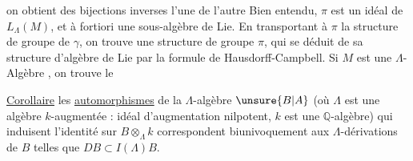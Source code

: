 
on obtient des bijections inverses l'une de l'autre
\diagram{\begin{tikzcd}[ampersand replacement=\&]
\pi \arrow[r,bend left=15,"\exp"] \& \gamma \arrow[l,bend left=15,"\log"]
\end{tikzcd}}
Bien entendu, $\pi$ est un idéal  de $L_\Lambda(M)$, et
à fortiori une sous-algèbre de Lie. En
transportant à $\pi$ la structure de groupe de
$\gamma$, on trouve une structure de groupe 
$\pi$, qui se déduit de sa structure
d'algèbre de Lie par la formule de
Hausdorff-Campbell. Si $M$ est une
$\Lambda$-Algèbre , on trouve le

\uline{Corollaire} les \uline{automorphismes} de la
$\Lambda$-algèbre \uline{$\unsure{B|A}$} (où $\Lambda$ est une algèbre
$k$-augmentée :  idéal d'augmentation
nilpotent, $k$ est une $\mathbb Q$-algèbre)
qui induisent l'identité sur $B\otimes_\Lambda k$
correspondent biunivoquement aux
$\Lambda$-dérivations  de $B$ telles que $DB\subset I(\Lambda)B$.

